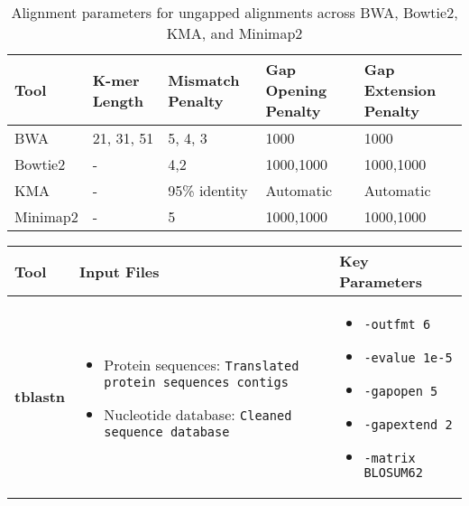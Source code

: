 \documentclass[11pt]{article}
\begin{document}
\begin{itemize}
\begin{table}[h!]
	\centering
	\begin{adjustbox}{max width=\linewidth}
		\begin{tabular}{|p{2.5cm}|p{2.5cm}|p{2.5cm}|p{2.5cm}|p{2.5cm}|}
			\hline
			\textbf{Tool} & \textbf{K-mer Length} & \textbf{Mismatch Penalty} & \textbf{Gap Opening Penalty} & \textbf{Gap Extension Penalty} \\ \hline
			BWA & 21, 31, 51 & 5, 4, 3 & 1000 & 1000 \\ \hline
			Bowtie2 & - & 4,2 & 1000,1000 & 1000,1000 \\ \hline
			KMA & - & 95\% identity & Automatic & Automatic \\ \hline
			Minimap2 & - & 5 & 1000,1000 & 1000,1000 \\ \hline
		\end{tabular}
	\end{adjustbox}
	\caption{Alignment parameters for ungapped alignments across BWA, Bowtie2, KMA, and Minimap2}
	\label{tab:alignment_parameters}
\end{table}
	
	
\begin{table}[h!]
	\centering
	\begin{adjustbox}{max width=\linewidth}
		\begin{tabular}{|p{3cm}|p{4cm}|p{5cm}|}
			\hline
			\textbf{Tool} & \textbf{Input Files} & \textbf{Key Parameters} \\ \hline
			\textbf{tblastn} & 
			\begin{itemize}
				\item Protein sequences: \texttt{Translated protein sequences contigs}
				\item Nucleotide database: \texttt{Cleaned sequence database}
			\end{itemize} 
			& 
			\begin{itemize}
				\item \texttt{-outfmt 6}
				\item \texttt{-evalue 1e-5}
				\item \texttt{-gapopen 5}
				\item \texttt{-gapextend 2}
				\item \texttt{-matrix BLOSUM62}
			\end{itemize} \\ \hline
			

\end{tabular}
\end{adjustbox}
\end{table}
\end{itemize}
\end{document}

